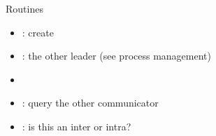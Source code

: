 \begin{frame}[containsverbatim]{Routines}
\label{sl:intercomm-routines}
\begin{itemize}
\item
  : create
\item {}: the other leader (see process management)
\item {}
\item {}: query the other communicator
\item {}: is this an inter or intra?
\end{itemize}
\end{frame}
